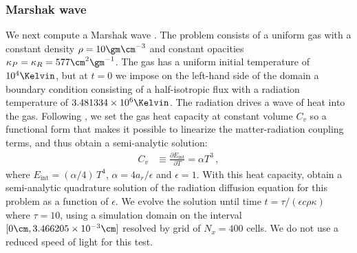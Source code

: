 \documentclass[fleqn,usenatbib]{mnras}
\begin{document}
\subsubsection{Marshak wave}
\label{ssec:marshak}
We next compute a Marshak wave \citep{Marshak_1958}. The problem consists of a uniform gas with a constant density $\rho = 10 \gm \cm^{-3}$ and constant opacities $\kappa_P = \kappa_R = 577 \cm^{2} \gm^{-1}$. The gas has a uniform initial temperature of $10^4 \Kelvin$, but at $t=0$ we impose on the left-hand side of the domain a boundary condition consisting of a half-isotropic flux with a radiation temperature of $3.481334 \times 10^6 \Kelvin$. The radiation drives a wave of heat into the gas. Following \cite{Su_1996}, we set the gas heat capacity at constant volume $C_v$ so a functional form that makes it possible to linearize the matter-radiation coupling terms, and thus obtain a semi-analytic solution:
\begin{align}
C_v &\equiv \frac{\partial E_{\text{int}}}{\partial T} = \alpha T^3 \, ,
\label{eq:heat_capacity}
\end{align}
where $E_{\text{int}} = (\alpha / 4) \, T^4$, $\alpha = 4 a_r / \epsilon$ and $\epsilon = 1$. With this heat capacity, \cite{Su_1996} obtain a semi-analytic quadrature solution of the radiation diffusion equation for this problem as a function of $\epsilon$. We evolve the solution until time $t = \tau / (\epsilon c \rho \kappa)$ where $\tau = 10$, using a simulation domain on the interval $[0 \cm, 3.466205 \times 10^{-3}\cm]$ resolved by grid of $N_x = 400$ cells. We do not use a reduced speed of light for this test.
\end{document}
